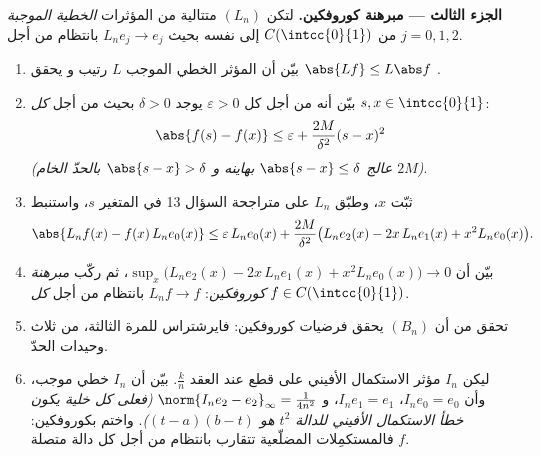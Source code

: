 \begin{problem}
\medskip
\noindent\textbf{الجزء الثالث --- مبرهنة كوروفكين.} لتكن $(L_n)$
متتالية من المؤثرات \emph{الخطية الموجبة} من
$C(\intcc{0}{1})$ إلى نفسه بحيث $L_ne_j \to e_j$
بانتظام من أجل $j = 0, 1, 2$.
\begin{enumerate}[resume]
  \item بيّن أن المؤثر الخطي الموجب $L$ رتيب و
        يحقق $\abs{Lf} \leq L\abs f$ .
  \item بيّن أنه من أجل كل $\varepsilon > 0$ يوجد $\delta > 0$
        بحيث من أجل \emph{كل} $s, x \in \intcc{0}{1}$:
        \[
        \abs{f(s) - f(x)} \leq \varepsilon +
        \frac{2M}{\delta^2}(s - x)^2
        \]
        \emph{(عالج $\abs{s - x} \leq \delta$ بهاينه و
        $\abs{s-x} > \delta$ بالحدّ الخام $2M$)}.
  \item ثبّت $x$، وطبّق $L_n$ على متراجحة السؤال 13
        في المتغير $s$، واستنبط
        \[
        \abs{L_nf(x) - f(x)\,L_ne_0(x)}
        \leq \varepsilon\,L_ne_0(x) + \frac{2M}{\delta^2}
        \bigl(L_ne_2(x) - 2x\,L_ne_1(x) + x^2 L_ne_0(x)\bigr).
        \]
  \item بيّن أن $\sup_x \bigl(L_ne_2(x) - 2x\,L_ne_1(x) + x^2
        L_ne_0(x)\bigr) \to 0$، ثم ركّب
        \emph{مبرهنة كوروفكين}: $L_nf \to f$ بانتظام من أجل
        \emph{كل} $f \in C(\intcc{0}{1})$.
  \item تحقق من أن $(B_n)$ يحقق فرضيات كوروفكين:
        فايرشتراس للمرة الثالثة، من ثلاث وحيدات الحدّ.
  \item ليكن $I_n$ مؤثر الاستكمال الأفيني على قطع
        عند العقد $\frac kn$. بيّن أن $I_n$
        خطي موجب، وأن $I_ne_0 = e_0$، $I_ne_1 = e_1$، و
        $\norm{I_ne_2 - e_2}_\infty = \frac{1}{4n^2}$
        \emph{(فعلى كل خلية يكون خطأ الاستكمال الأفيني
        للدالة $t^2$ هو $(t - a)(b - t)$)}. واختم بكوروفكين:
        فالمستكمِلات المضلّعية تتقارب بانتظام من أجل كل
        دالة متصلة $f$.
\end{enumerate}


\end{problem}
